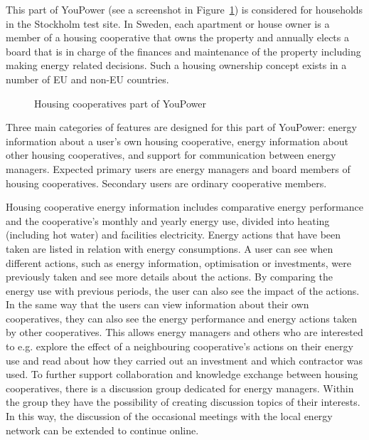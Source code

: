 This part of YouPower (see a screenshot in Figure~\ref{fig:brf}) is considered for households in the Stockholm test site. In Sweden, each apartment or house owner is a member of a housing cooperative that owns the property and annually elects a board that is in charge of the finances and maintenance of the property including making energy related decisions. 
Such a housing ownership concept exists in a number of EU and non-EU countries.
% 
\begin{figure}[t!]
\centering
{}
\caption{Housing cooperatives part of YouPower}
\label{fig:brf}
\end{figure}
% 
Three main categories of features are designed for this part of YouPower: energy information about a user's own housing cooperative, energy information about other housing cooperatives, and support for communication between energy managers.
Expected primary users are energy managers and board members of housing cooperatives. Secondary users are ordinary cooperative members. 

Housing cooperative energy information includes comparative energy performance %
and the cooperative's monthly and yearly energy use, divided into heating (including hot water) and facilities electricity. Energy actions that have been taken are listed in relation with energy consumptions. 
A user can see when different actions, such as energy information, optimisation or investments, were previously taken and see more details about the actions. By comparing the energy use with previous periods, the user can also see the impact of the actions.
% 
In the same way that the users can view information about their own cooperatives, they can also see the energy performance and energy actions taken by other cooperatives. This allows energy managers and others who are interested to e.g. explore the effect of a neighbouring cooperative's actions on their energy use and read about how they carried out an investment and which contractor was used. 
% 
To further support collaboration and knowledge exchange between housing cooperatives, there is a discussion group dedicated for energy managers. Within the group they have the possibility of creating discussion topics of their interests. In this way, the discussion of the occasional meetings with the local energy network can be extended to continue online.


